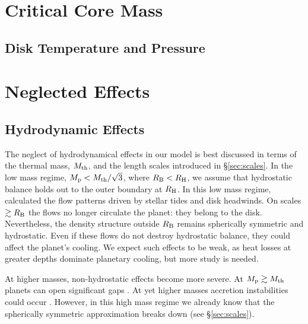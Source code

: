 \documentclass[apj, numberedappendix]{emulateapj}
\newcommand{\RB}{R_{\rm B}}
\newcommand{\RH}{R_{\rm H}}
\newcommand{\pla}{_{\rm p}}
\begin{document}
\section{Critical Core Mass}
\label{sec:critical}


\subsection{Disk Temperature and Pressure}
\label{sec:TPeffects}

\section{Neglected Effects}\label{sec:neglected}

\subsection{Hydrodynamic Effects}\label{sec:hydro}
The neglect of hydrodynamical effects in our model is best discussed in terms of the thermal mass, $M_{\rm th}$, and the length scales introduced in \S\ref{sec:scales}.  In the low mass regime, $M\pla < M_{\rm th}/ \sqrt{3}$, where $\RB < \RH$, we assume that hydrostatic balance holds out to the outer boundary at $\RH$.   In this low mass regime, \citet[]{Orm13} calculated the flow patterns driven by stellar tides and disk headwinds.     On scales $\gtrsim \RB$ the flows no longer circulate the planet: they belong to the disk.  Nevertheless, the density structure outside $\RB$ remains spherically symmetric and hydrostatic.  Even if these flows do not destroy hydrostatic balance, they could affect the planet's cooling.  We expect such effects to be weak, as heat losses at greater depths dominate planetary cooling, but more study is needed.

At higher masses, non-hydrostatic effects become more severe.  At $M\pla \gtrsim M_{\rm th}$ planets can open significant gaps \citep{zhu13}.  At yet higher masses accretion instabilities could occur \citep{AylBat12}.  However, in this high mass regime we already know that the spherically symmetric approximation breaks down (see \S\ref{sec:scales}). %
\end{document}
